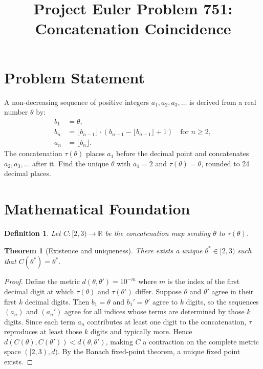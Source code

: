 \documentclass[12pt]{article}
\title{Project Euler Problem 751: Concatenation Coincidence}
\author{}
\date{}
\newtheorem{theorem}{Theorem}
\newtheorem{definition}{Definition}
\begin{document}
\maketitle

\section{Problem Statement}

A non-decreasing sequence of positive integers $a_1, a_2, a_3, \ldots$ is derived from a real number $\theta$ by:
\begin{align}
b_1 &= \theta, \\
b_n &= \lfloor b_{n-1} \rfloor \cdot (b_{n-1} - \lfloor b_{n-1} \rfloor + 1) \quad \text{for } n \geq 2, \\
a_n &= \lfloor b_n \rfloor.
\end{align}
The concatenation $\tau(\theta)$ places $a_1$ before the decimal point and concatenates $a_2, a_3, \ldots$ after it. Find the unique $\theta$ with $a_1 = 2$ and $\tau(\theta) = \theta$, rounded to 24 decimal places.

\section{Mathematical Foundation}

\begin{definition}
Let $C: [2,3) \to \mathbb{R}$ be the \emph{concatenation map} sending $\theta$ to $\tau(\theta)$.
\end{definition}

\begin{theorem}[Existence and uniqueness]
There exists a unique $\theta^* \in [2,3)$ such that $C(\theta^*) = \theta^*$.
\end{theorem}

\begin{proof}
Define the metric $d(\theta, \theta') = 10^{-m}$ where $m$ is the index of the first decimal digit at which $\tau(\theta)$ and $\tau(\theta')$ differ. Suppose $\theta$ and $\theta'$ agree in their first $k$ decimal digits. Then $b_1 = \theta$ and $b_1' = \theta'$ agree to $k$ digits, so the sequences $(a_n)$ and $(a_n')$ agree for all indices whose terms are determined by those $k$ digits. Since each term $a_n$ contributes at least one digit to the concatenation, $\tau$ reproduces at least those $k$ digits and typically more. Hence $d(C(\theta), C(\theta')) < d(\theta, \theta')$, making $C$ a contraction on the complete metric space $([2,3), d)$. By the Banach fixed-point theorem, a unique fixed point exists.
\end{proof}
\end{document}
